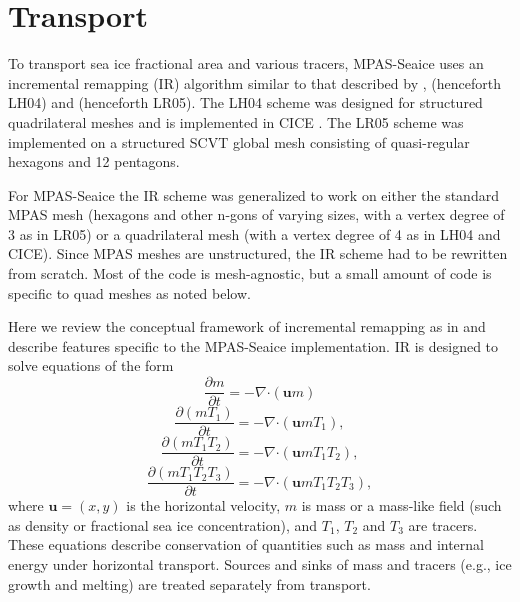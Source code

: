\section{Transport}
\label{sec:transport}

\label{describe_transport}

To transport sea ice fractional area and various tracers, MPAS-Seaice uses an incremental remapping (IR) algorithm similar to that described by \citet{Dukowicz00}, \citet{Lipscomb04} (henceforth LH04) and \citet{Lipscomb05} (henceforth LR05). The LH04 scheme was designed for structured quadrilateral meshes and is implemented in CICE \citep{Hunke15}. The LR05 scheme was implemented on a structured SCVT global mesh consisting of quasi-regular hexagons and 12 pentagons.

For MPAS-Seaice the IR scheme was generalized to work on either the standard MPAS mesh (hexagons and other n-gons of varying sizes, with a vertex degree of 3 as in LR05) or a quadrilateral mesh (with a vertex degree of 4 as in LH04 and CICE). Since MPAS meshes are unstructured, the IR scheme had to be rewritten from scratch. Most of the code is mesh-agnostic, but a small amount of code is specific to quad meshes as noted below.

Here we review the conceptual framework of incremental remapping as in \citep{Hunke15} and describe features specific to the MPAS-Seaice implementation. IR is designed to solve equations of the form
\begin{equation}
\label{eq:transport_m}
\frac{\partial m}{\partial t} =-\nabla \boldsymbol{\cdot} (\mathbf{u}m)
\end{equation}
\begin{equation}
\label{eq:transport_T1}
\frac{\partial (m T_1)}{\partial t} = -\nabla \boldsymbol{\cdot} (\mathbf{u} m T_1),
\end{equation}
\begin{equation}
\label{eq:transport_T2}
\frac{\partial (m T_1 T_2)}{\partial t} = -\nabla \boldsymbol{\cdot} (\mathbf{u} m T_1 T_2),
\end{equation}
\begin{equation}
\label{eq:transport_T3}
\frac{\partial (m T_1 T_2 T_3)}{\partial t} = -\nabla \boldsymbol{\cdot} (\mathbf{u} m T_1 T_2 T_3),
\end{equation}
where $\mathbf{u} = (x,y)$ is the horizontal velocity, $m$ is mass or a mass-like field (such as density or fractional sea ice concentration), and $T_1$, $T_2$ and $T_3$ are tracers.  These equations describe conservation of quantities such as mass and internal energy under horizontal transport. Sources and sinks of mass and tracers (e.g., ice growth and melting) are treated separately from transport.  

